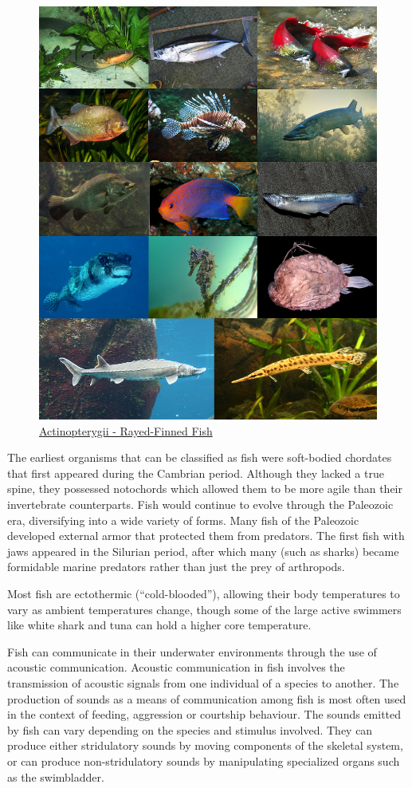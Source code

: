 \begin{figure}

{\centering \includegraphics[width=0.7\linewidth]{./figures/animals/Actinopterygii-0001} 

}

\caption{\href{https://commons.wikimedia.org/wiki/File:Actinopterygii-0001.jpg}{Actinopterygii - Rayed-Finned Fish}}\label{fig:actinopterygii}
\end{figure}

The earliest organisms that can be classified as fish were soft-bodied chordates that first appeared during the Cambrian period. Although they lacked a true spine, they possessed notochords which allowed them to be more agile than their invertebrate counterparts. Fish would continue to evolve through the Paleozoic era, diversifying into a wide variety of forms. Many fish of the Paleozoic developed external armor that protected them from predators. The first fish with jaws appeared in the Silurian period, after which many (such as sharks) became formidable marine predators rather than just the prey of arthropods.

Most fish are ectothermic (``cold-blooded''), allowing their body temperatures to vary as ambient temperatures change, though some of the large active swimmers like white shark and tuna can hold a higher core temperature.

Fish can communicate in their underwater environments through the use of acoustic communication. Acoustic communication in fish involves the transmission of acoustic signals from one individual of a species to another. The production of sounds as a means of communication among fish is most often used in the context of feeding, aggression or courtship behaviour. The sounds emitted by fish can vary depending on the species and stimulus involved. They can produce either stridulatory sounds by moving components of the skeletal system, or can produce non-stridulatory sounds by manipulating specialized organs such as the swimbladder.

